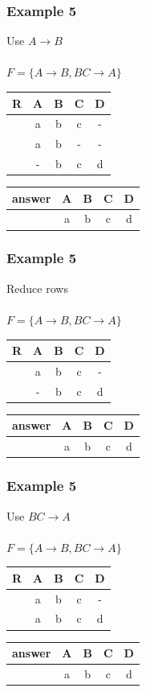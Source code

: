\documentclass{beamer}
\begin{document}
\begin{frame}
  \frametitle{Example 5}
  Use $A \rightarrow B$\\
  \hfill \\
  $F = \{A \rightarrow B, BC \rightarrow A\}$\\
  \begin{tabular}{ c | c c c c}
  R & A & B & C & D\\
  \hline
  &a & b & c  & - \\
  &a & b & -  & - \\
  &- & b & c  & d \\
  \end{tabular}

  \begin{tabular}{ c | c c c c}
  answer & A & B & C & D\\
  \hline
  & a & b & c  & d \\
  \end{tabular}

\end{frame}

\begin{frame}
  \frametitle{Example 5}
  Reduce rows\\
  \hfill \\
  $F = \{A \rightarrow B, BC \rightarrow A\}$\\
  \begin{tabular}{ c | c c c c}
  R & A & B & C & D\\
  \hline
  &a & b & c  & - \\
  &- & b & c  & d \\
  \end{tabular}

  \begin{tabular}{ c | c c c c}
  answer & A & B & C & D\\
  \hline
  & a & b & c  & d \\
  \end{tabular}
\end{frame}

\begin{frame}
  \frametitle{Example 5}
  Use $BC \rightarrow A$\\
  \hfill \\
  $F = \{A \rightarrow B, BC \rightarrow A\}$\\
  \begin{tabular}{ c | c c c c}
  R & A & B & C & D\\
  \hline
  &a & b & c  & - \\
  &a & b & c  & d \\
  \end{tabular}

  \begin{tabular}{ c | c c c c}
  answer & A & B & C & D\\
  \hline
  & a & b & c  & d \\
  \end{tabular}
\end{frame}
\end{document}

